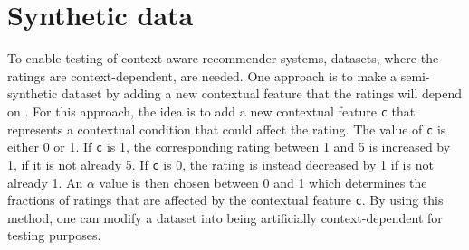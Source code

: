 \section{Synthetic data}
To enable testing of context-aware recommender systems, datasets, where the ratings are context-dependent, are needed.
One approach is to make a semi-synthetic dataset by adding a new contextual feature that the ratings will depend on \cite{baltrunasContextItemSplit}.
For this approach, the idea is to add a new contextual feature \texttt{c} that represents a contextual condition that could affect the rating.
The value of \texttt{c} is either 0 or 1. 
If \texttt{c} is 1, the corresponding rating between 1 and 5 is increased by 1, if it is not already 5.
If \texttt{c} is 0, the rating is instead decreased by 1 if is not already 1.
An $\alpha$ value is then chosen between 0 and 1 which determines the fractions of ratings that are affected by the contextual feature \texttt{c}.
By using this method, one can modify a dataset into being artificially context-dependent for testing purposes.
